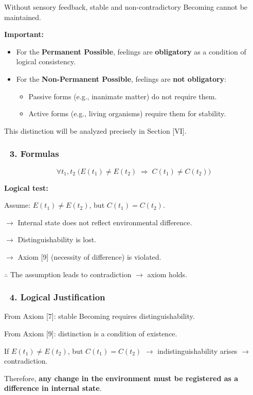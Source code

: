 \documentclass[12pt]{article}
\begin{document}
Without sensory feedback, stable and non-contradictory Becoming cannot be maintained.

\textbf{Important:}
\begin{itemize}
\item For the \textbf{Permanent Possible}, feelings are \textbf{obligatory} as a condition of logical consistency.
\item For the \textbf{Non-Permanent Possible}, feelings are \textbf{not obligatory}:
    \begin{itemize}
    \item Passive forms (e.g., inanimate matter) do not require them.
    \item Active forms (e.g., living organisms) require them for stability.
    \end{itemize}
\end{itemize}

This distinction will be analyzed precisely in Section [VI].

\subsubsection*{🔹 3. Formulas}
\[
\forall t_1, t_2 \;\big( E(t_1) \neq E(t_2) \;\Rightarrow\; C(t_1) \neq C(t_2) \big)
\]

\textbf{Logical test:}

Assume: $E(t_1) \neq E(t_2)$, but $C(t_1) = C(t_2)$.

$\rightarrow$ Internal state does not reflect environmental difference.

$\rightarrow$ Distinguishability is lost.

$\rightarrow$ Axiom [9] (necessity of difference) is violated.

$\therefore$ The assumption leads to contradiction $\rightarrow$ axiom holds.

\subsubsection*{🔹 4. Logical Justification}
From Axiom [7]: stable Becoming requires distinguishability.

From Axiom [9]: distinction is a condition of existence.

If $E(t_1) \neq E(t_2)$, but $C(t_1) = C(t_2)$ $\rightarrow$ indistinguishability arises $\rightarrow$ contradiction.

Therefore, \textbf{any change in the environment must be registered as a difference in internal state}.
\end{document}
